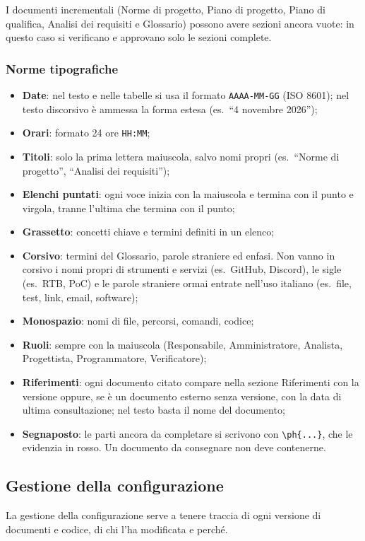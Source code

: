 \documentclass[12pt,a4paper]{article}
\newcommand{\tightlist}{\setlength{\itemsep}{1pt}\setlength{\parskip}{0pt}}
\begin{document}
I documenti incrementali (Norme di progetto, Piano di progetto, Piano di qualifica, Analisi dei requisiti e Glossario) possono avere sezioni ancora vuote: in questo caso si verificano e approvano solo le sezioni complete.

\subsubsection{Norme tipografiche}\label{sec:tipografia}
\begin{itemize}
\tightlist
\item \textbf{Date}: nel testo e nelle tabelle si usa il formato \texttt{AAAA-MM-GG} (ISO 8601); nel testo discorsivo è ammessa la forma estesa (es.\ ``4 novembre 2026'');
\item \textbf{Orari}: formato 24 ore \texttt{HH:MM};
\item \textbf{Titoli}: solo la prima lettera maiuscola, salvo nomi propri (es.\ ``Norme di progetto'', ``Analisi dei requisiti'');
\item \textbf{Elenchi puntati}: ogni voce inizia con la maiuscola e termina con il punto e virgola, tranne l'ultima che termina con il punto;
\item \textbf{Grassetto}: concetti chiave e termini definiti in un elenco;
\item \textbf{Corsivo}: termini del Glossario, parole straniere ed enfasi. Non vanno in corsivo i nomi propri di strumenti e servizi (es.\ GitHub, Discord), le sigle (es.\ RTB, PoC) e le parole straniere ormai entrate nell'uso italiano (es.\ file, test, link, email, software);
\item \textbf{Monospazio}: nomi di file, percorsi, comandi, codice;
\item \textbf{Ruoli}: sempre con la maiuscola (Responsabile, Amministratore, Analista, Progettista, Programmatore, Verificatore);
\item \textbf{Riferimenti}: ogni documento citato compare nella sezione Riferimenti con la versione oppure, se è un documento esterno senza versione, con la data di ultima consultazione; nel testo basta il nome del documento;
\item \textbf{Segnaposto}: le parti ancora da completare si scrivono con \texttt{\textbackslash ph\{...\}}, che le evidenzia in rosso. Un documento da consegnare non deve contenerne.
\end{itemize}

\subsection{Gestione della configurazione}
La gestione della configurazione serve a tenere traccia di ogni versione di documenti e codice, di chi l'ha modificata e perché.
\end{document}
